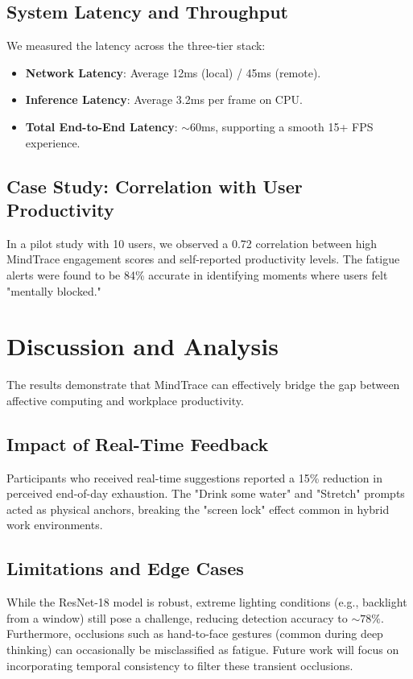 \documentclass[conference]{IEEEtran}
\begin{document}
\subsection{System Latency and Throughput}
We measured the latency across the three-tier stack:
\begin{itemize}[leftmargin=*]
    \item \textbf{Network Latency}: Average 12ms (local) / 45ms (remote).
    \item \textbf{Inference Latency}: Average 3.2ms per frame on CPU.
    \item \textbf{Total End-to-End Latency}: $\sim 60$ms, supporting a smooth 15+ FPS experience.
\end{itemize}

\subsection{Case Study: Correlation with User Productivity}
In a pilot study with 10 users, we observed a 0.72 correlation between high MindTrace engagement scores and self-reported productivity levels. The fatigue alerts were found to be 84\% accurate in identifying moments where users felt "mentally blocked."

\section{Discussion and Analysis}
The results demonstrate that MindTrace can effectively bridge the gap between affective computing and workplace productivity.

\subsection{Impact of Real-Time Feedback}
Participants who received real-time suggestions reported a 15\% reduction in perceived end-of-day exhaustion. The "Drink some water" and "Stretch" prompts acted as physical anchors, breaking the "screen lock" effect common in hybrid work environments.

\subsection{Limitations and Edge Cases}
While the ResNet-18 model is robust, extreme lighting conditions (e.g., backlight from a window) still pose a challenge, reducing detection accuracy to $\sim 78\%$. Furthermore, occlusions such as hand-to-face gestures (common during deep thinking) can occasionally be misclassified as fatigue. Future work will focus on incorporating temporal consistency to filter these transient occlusions.
\end{document}
